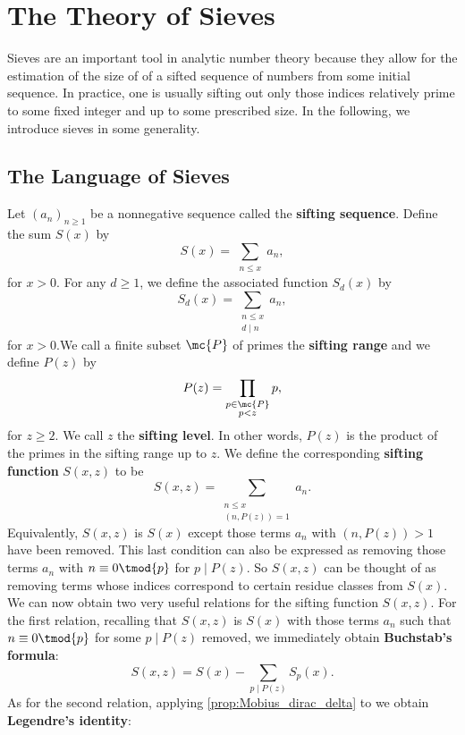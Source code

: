 \chapter{The Theory of Sieves}
  Sieves are an important tool in analytic number theory because they allow for the estimation of the size of of a sifted sequence of numbers from some initial sequence. In practice, one is usually sifting out only those indices relatively prime to some fixed integer and up to some prescribed size. In the following, we introduce sieves in some generality.
  \section{The Language of Sieves}
    Let $(a_{n})_{n \ge 1}$ be a nonnegative sequence called the \textbf{sifting sequence}. Define the sum $S(x)$ by
    \[
      S(x) = \sum_{\substack{n \le x}}a_{n},
    \]
    for $x > 0$. For any $d \ge 1$, we define the associated function $S_{d}(x)$ by
    \[
      S_{d}(x) = \sum_{\substack{n \le x \\ d \mid n}}a_{n},
    \]
    for $x > 0$.We call a finite subset $\mc{P}$ of primes the \textbf{sifting range} and we define $P(z)$ by
    \[
      P(z) = \prod_{\substack{p \in \mc{P} \\ p < z}}p,
    \]
    for $z \ge 2$. We call $z$ the \textbf{sifting level}. In other words, $P(z)$ is the product of the primes in the sifting range up to $z$. We define the corresponding \textbf{sifting function} $S(x,z)$ to be
    \[
      S(x,z) = \sum_{\substack{n \le x \\ (n,P(z)) = 1}}a_{n}.
    \]
    Equivalently, $S(x,z)$ is $S(x)$ except those terms $a_{n}$ with $(n,P(z)) > 1$ have been removed. This last condition can also be expressed as removing those terms $a_{n}$ with $n \equiv 0 \tmod{p}$ for $p \mid P(z)$. So $S(x,z)$ can be thought of as removing terms whose indices correspond to certain residue classes from $S(x)$. We can now obtain two very useful relations for the sifting function $S(x,z)$. For the first relation, recalling that $S(x,z)$ is $S(x)$ with those terms $a_{n}$ such that $n \equiv 0 \tmod{p}$ for some $p \mid P(z)$ removed, we immediately obtain \textbf{Buchstab's formula}:
    \[
      S(x,z) = S(x)-\sum_{p \mid P(z)}S_{p}(x).
    \]
    As for the second relation, applying \cref{prop:Mobius_dirac_delta} to  we obtain \textbf{Legendre's identity}:
